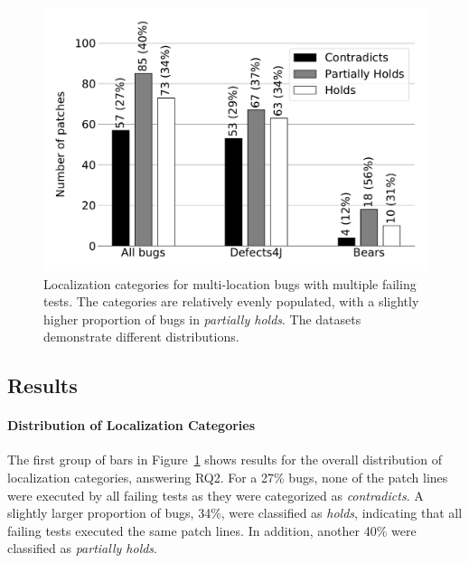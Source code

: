 \documentclass[10pt, conference]{IEEEtran}
\begin{document}
\begin{figure}
	\includegraphics[width=\linewidth]{img/coverage_hist_all.pdf}
	\caption{\small Localization categories for multi-location bugs with multiple failing
      tests. The categories are relatively 
      evenly populated, with a slightly higher proportion of bugs in
      \emph{partially holds}. The datasets demonstrate different distributions.}
	\label{fig:coverage-all}
\end{figure}

\subsection{Results}
 \label{sec:cov_patterns}

\paragraph{Distribution of Localization Categories}
The first group of bars in Figure~\ref{fig:coverage-all} shows results for the overall distribution 
of localization categories, 
answering RQ2. 
For a 27\% bugs, none of the patch lines were executed by all failing tests as they were 
categorized as \emph{contradicts}.  A slightly larger proportion of bugs, 34\%, were classified 
as 
\emph{holds}, indicating that all failing tests executed the same patch lines.
In addition, another 40\% were classified as \emph{partially holds}.
\end{document}
